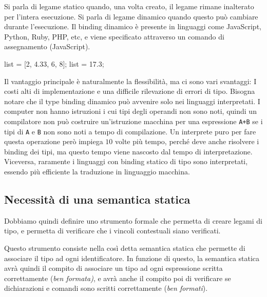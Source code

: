 \documentclass[oneside,a4paper,11pt]{book}
\theoremstyle{italicstyle}
\theoremstyle{normStyle}
\begin{document}
Si parla di legame statico quando, una volta creato, il legame rimane inalterato
per l’intera esecuzione. Si parla di
legame dinamico quando questo può cambiare durante l’esecuzione.
Il binding dinamico è presente in linguaggi come JavaScript, Python, Ruby, PHP, etc,
e viene specificato attraverso un comando di assegnamento (JavaScript).
\begin{algorithm}
  list = [2, 4.33, 6, 8];
  list = 17.3;
\end{algorithm}
Il vantaggio principale è naturalmente la flessibilità, ma ci sono vari
svantaggi: I costi alti di implementazione e una difficile rilevazione
di errori di tipo. Bisogna notare che il type binding dinamico può
avvenire solo nei linguaggi interpretati. I computer non hanno
istruzioni i cui tipi degli operandi non sono noti, quindi un
compilatore non può costruire un'istruzione macchina per una espressione
\verb|A+B| se i tipi di \verb|A| e \verb|B| non sono noti a tempo di compilazione.
Un interprete puro per fare questa operazione però impiega $10$ volte più tempo,
perché deve anche risolvere i binding dei tipi, ma questo tempo viene nascosto
dal tempo di interpretazione. Viceversa, raramente i linguaggi con binding
statico di tipo sono interpretati, essendo più efficiente la traduzione in
linguaggio macchina.
\subsection{Necessità di una semantica statica}
Dobbiamo quindi definire uno strumento formale che permetta di creare legami di tipo,
e permetta di verificare che i vincoli contestuali siano verificati.

Questo strumento consiste nella così detta semantica statica che permette
di associare il tipo ad ogni identificatore. In funzione di questo, la
semantica statica avrà quindi il compito di associare un tipo ad ogni
espressione scritta correttamente (\textit{ben formata)}, e avrà anche il compito
poi di verificare se dichiarazioni e comandi sono scritti correttamente
(\textit{ben formati}).
\end{document}
